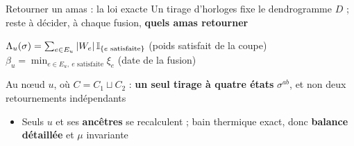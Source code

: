 \begin{frame}[t]{Retourner un amas : la loi exacte}
    \small
    Un tirage d'horloges fixe le dendrogramme $D$ ; reste à décider, à chaque fusion, \textbf{quels
    amas retourner}

    \vspace{0.08cm}
    \begin{center}
    \end{center}

    \vspace{0.02cm}
    \begin{center}
        {\footnotesize $\Lambda_u(\sigma) = \sum_{e \in E_u} |W_e|\, \mathbb{I}_{\{e \text{ satisfaite}\}}$
        \; (poids satisfait de la coupe) \qquad
        $\beta_u = \min_{e \in E_u,\ e \text{ satisfaite}} \xi_e$ \; (date de la fusion)}
    \end{center}

    \vspace{0.08cm}
    Au nœud $u$, où $C = C_1 \sqcup C_2$ : \textbf{un seul tirage à quatre états} $\sigma^{ab}$,
    et non deux retournements indépendants

    \vspace{0.04cm}
    \begin{center}
    \end{center}

    \vspace{0.02cm}
    \begin{itemize}
        \item Seuls $u$ et ses \textbf{ancêtres} se recalculent ; bain thermique exact, donc
        \textbf{balance détaillée} et $\mu$ invariante 
    \end{itemize}
\end{frame}

